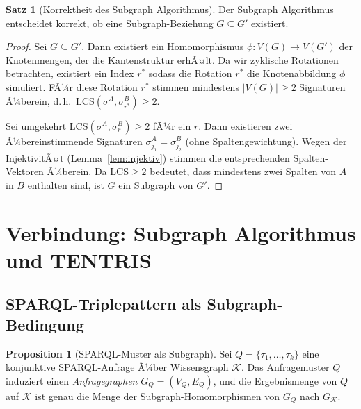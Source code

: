 ﻿\documentclass[a4paper,12pt]{article}
\theoremstyle{definition}
\newtheorem{satz}{Satz}
\newtheorem{proposition}{Proposition}
\begin{document}
\begin{satz}[Korrektheit des Subgraph Algorithmus]
\label{satz:korrektheit}
Der Subgraph Algorithmus entscheidet korrekt, ob eine Subgraph-Beziehung
$G \subseteq G'$ existiert.
\end{satz}

\begin{proof}
Sei $G \subseteq G'$. Dann existiert ein Homomorphismus $\phi: V(G) \to V(G')$
der Knotenmengen, der die Kantenstruktur erhÃ¤lt. Da wir zyklische Rotationen
betrachten, existiert ein Index $r^*$ sodass die Rotation $r^*$ die Knotenabbildung
$\phi$ simuliert. FÃ¼r diese Rotation $r^*$ stimmen mindestens $|V(G)| \geq 2$ Signaturen
Ã¼berein, d.\,h.\ $\mathrm{LCS}(\sigma^A, \sigma^B_{r^*}) \geq 2$.

Sei umgekehrt $\mathrm{LCS}(\sigma^A, \sigma^B_r) \geq 2$ fÃ¼r ein $r$. Dann existieren
zwei Ã¼bereinstimmende Signaturen $\sigma_{j_1}^A = \sigma_{j_2}^B$ (ohne Spaltengewichtung).
Wegen der InjektivitÃ¤t (Lemma~\ref{lem:injektiv}) stimmen die entsprechenden
Spalten-Vektoren Ã¼berein. Da $\mathrm{LCS} \geq 2$ bedeutet, dass mindestens zwei
Spalten von $A$ in $B$ enthalten sind, ist $G$ ein Subgraph von $G'$.
\end{proof}

\section{Verbindung: Subgraph Algorithmus und TENTRIS}
\label{sec:verbindung}

\subsection{SPARQL-Triplepattern als Subgraph-Bedingung}

\begin{proposition}[SPARQL-Muster als Subgraph]
\label{prop:sparql_subgraph}
Sei $Q = \{\tau_1, \ldots, \tau_k\}$ eine konjunktive SPARQL-Anfrage Ã¼ber
Wissensgraph $\mathcal{K}$. Das Anfragemuster $Q$ induziert einen
\emph{Anfragegraphen} $G_Q = (V_Q, E_Q)$, und die Ergebnismenge von $Q$ auf
$\mathcal{K}$ ist genau die Menge der Subgraph-Homomorphismen von $G_Q$ nach
$G_{\mathcal{K}}$.
\end{proposition}
\end{document}
